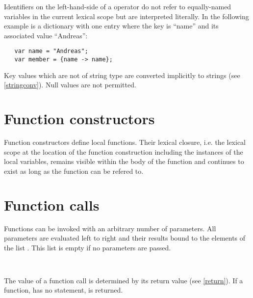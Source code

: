 \noindent
Identifiers on the left-hand-side of a \token{->} operator do not
refer to equally-named variables in the current lexical scope but are
interpreted literally. In the following example  is a
dictionary with one entry where the key is ``name'' and its associated
value ``Andreas'':

\begin{lstlisting}
   var name = "Andreas";
   var member = {name -> name};
\end{lstlisting}

\noindent
Key values which are not of string type are converted implicitly
to strings (see \ref{stringconv}). Null values are not permitted.

\section{Function constructors}

Function constructors define local functions. Their lexical closure,
i.e. the lexical scope at the location of the function construction
including the instances of the local variables, remains visible within
the body of the function and continues to exist as long as the function
can be refered to.

\begin{grammar}
      \produces {} 
\end{grammar}

\section{Function calls}

Functions can be invoked with an arbitrary number of parameters.
All parameters are evaluated left to right and their results
bound to the elements of the list . This list is
empty if no parameters are passed.

\begin{grammar}
      \produces {} \lextoken{(} \lextoken{)} \\
      \produces {}
         \lextoken{(}  \lextoken{)}
\end{grammar}

\noindent
The value of a function call is determined by its return value
(see \ref{return}). If a function, has no 
statement,  is returned.

